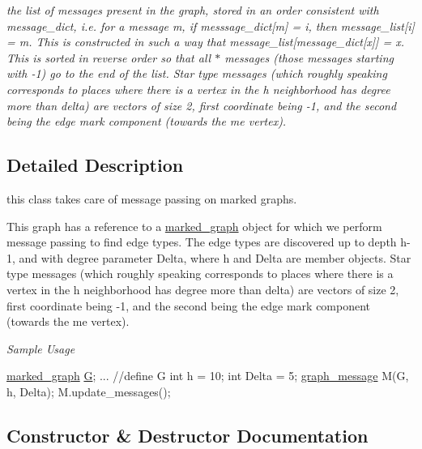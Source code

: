 \begin{DoxyCompactItemize}
\begin{DoxyCompactList}\small\item\em the list of messages present in the graph, stored in an order consistent with message\+\_\+dict, i.\+e. for a message m, if messsage\+\_\+dict\mbox{[}m\mbox{]} = i, then message\+\_\+list\mbox{[}i\mbox{]} = m. This is constructed in such a way that message\+\_\+list\mbox{[}message\+\_\+dict\mbox{[}x\mbox{]}\mbox{]} = x. This is sorted in reverse order so that all $\ast$ messages (those messages starting with -\/1) go to the end of the list. Star type messages (which roughly speaking corresponds to places where there is a vertex in the h neighborhood has degree more than delta) are vectors of size 2, first coordinate being -\/1, and the second being the edge mark component (towards the \textquotesingle{}me\textquotesingle{} vertex). \end{DoxyCompactList}\end{DoxyCompactItemize}


\subsection{Detailed Description}
this class takes care of message passing on marked graphs. 

This graph has a reference to a \hyperlink{classmarked__graph}{marked\+\_\+graph} object for which we perform message passing to find edge types. The edge types are discovered up to depth h-\/1, and with degree parameter Delta, where h and Delta are member objects. Star type messages (which roughly speaking corresponds to places where there is a vertex in the h neighborhood has degree more than delta) are vectors of size 2, first coordinate being -\/1, and the second being the edge mark component (towards the \textquotesingle{}me\textquotesingle{} vertex).

{\itshape Sample Usage}


\begin{DoxyCode}
\hyperlink{classmarked__graph}{marked\_graph} \hyperlink{classgraph__message_abffce6d6a7868da0e747425569759f0f}{G};
... \textcolor{comment}{//define G}
\textcolor{keywordtype}{int} h = 10;
\textcolor{keywordtype}{int} Delta = 5; 
\hyperlink{classgraph__message}{graph\_message} M(G, h, Delta);
M.update\_messages();
\end{DoxyCode}
 

\subsection{Constructor \& Destructor Documentation}
\mbox{\label{classgraph__message_a792e738b94a19f914e5495c416defe4d}} 

